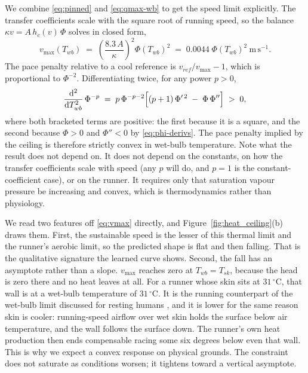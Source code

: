 We combine \eqref{eq:pinned} and \eqref{eq:qmax-wb} to get the speed limit
explicitly. The transfer coefficients scale with the square root of running
speed, so the balance $\kappa v = A\,h_c(v)\,\Phi$ solves in closed form,
\begin{equation}
  v_{\max}(T_{wb}) \;=\; \left(\frac{8.3\,A}{\kappa}\right)^{\!2}\Phi(T_{wb})^{2}
  \;=\; 0.0044\;\Phi(T_{wb})^{2}\ \mathrm{m\,s^{-1}} .
  \label{eq:vmax}
\end{equation}
The pace penalty relative to a cool reference is $v_{ref}/v_{\max} - 1$, which
is proportional to $\Phi^{-2}$. Differentiating twice, for any power $p > 0$,
\begin{equation}
  \frac{\mathrm{d}^2}{\mathrm{d}T_{wb}^2}\,\Phi^{-p}
  \;=\; p\,\Phi^{-p-2}\Bigl[(p+1)\,\Phi'^{\,2} \;-\; \Phi\,\Phi''\Bigr]
  \;>\; 0,
  \label{eq:convex-ceiling}
\end{equation}
where both bracketed terms are positive: the first because it is a square, and
the second because $\Phi > 0$ and $\Phi'' < 0$ by \eqref{eq:phi-derivs}. The
pace penalty implied by the ceiling is therefore strictly convex in wet-bulb
temperature. Note what the result does not depend on. It does not depend on the
constants, on how the transfer coefficients scale with speed (any $p$ will do,
and $p=1$ is the constant-coefficient case), or on the runner. It requires only
that saturation vapour pressure be increasing and convex, which is
thermodynamics rather than physiology.

We read two features off \eqref{eq:vmax} directly, and
Figure~\ref{fig:heat_ceiling}(b) draws them. First, the sustainable speed is the
lesser of this thermal limit and the runner's aerobic limit, so the predicted
shape is flat and then falling. That is the qualitative signature the learned
curve shows. Second, the fall has an asymptote rather than a slope. $v_{\max}$
reaches zero at $T_{wb} = T_{sk}$, because the head is zero there and no heat
leaves at all. For a runner whose skin sits at $31\,^{\circ}$C, that wall is at
a wet-bulb temperature of $31\,^{\circ}$C. It is the running counterpart of the
wet-bulb limit discussed for resting humans \citep{sherwood2010}, and it is
lower for the same reason skin is cooler: running-speed airflow over wet skin
holds the surface below air temperature, and the wall follows the surface down.
The runner's own heat production then ends compensable racing some six degrees
below even that wall. This is why we expect a convex response on physical
grounds. The constraint does not saturate as conditions worsen; it tightens
toward a vertical asymptote.

